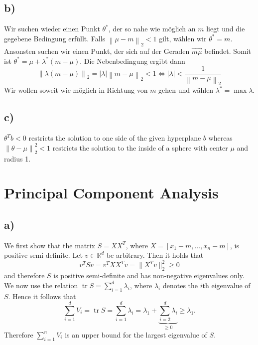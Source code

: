 \documentclass[paper=a4,fontsize=10pt,DIV11,BCOR10mm]{scrartcl}
\newcommand{\abs}[1]{\left\lvert#1\right\rvert}
\newcommand{\norm}[1]{\left\lVert#1\right\rVert}
\DeclareMathOperator{\tr}{tr}
\begin{document}
\subsection*{b)}

Wir suchen wieder einen Punkt $\theta^*$, der so nahe wie möglich an $m$ liegt und die gegebene Bedingung erfüllt. Falls $\norm{\mu - m}_2 < 1$ gilt, wählen wir $\theta^* = m$. Ansonsten suchen wir einen Punkt, der sich auf der Geraden $\overrightarrow{m \mu}$ befindet. Somit ist $\theta^* = \mu + \lambda^* (m - \mu)$. Die Nebenbedingung ergibt dann
\[ \norm{\lambda (m - \mu)}_2 = \abs{\lambda} \norm{m - \mu}_2 < 1 \Leftrightarrow \abs{\lambda} < \frac{1}{\norm{m - \mu}_2} \]
Wir wollen soweit wie möglich in Richtung von $m$ gehen und wählen $\lambda^* = \max \lambda$.



\subsection*{c)}

$\theta^T b < 0$ restricts the solution to one side of the given hyperplane $b$ whereas $\norm{\theta - \mu}_2^2 < 1$ restricts the solution to the inside of a sphere with center $\mu$ and radius 1.





\section{Principal Component Analysis}

\subsection*{a)}

We first show that the matrix $S=XX^T$, where $X=[x_1-m,\dots, x_n-m]$,  is positive semi-definite. Let $v \in \mathbb{R}^d$ be arbitrary. Then it holds that
\begin{equation*}
v^TSv=v^TXX^Tv=\lVert X^Tv\rVert_2^2 \geq 0
\end{equation*}
and therefore $S$ is positive semi-definite and has non-negative eigenvalues only.
We now use the relation $\tr S=\sum_{i=1}^d \lambda_i$, where $\lambda_i$ denotes the $i$th eigenvalue of $S$.
Hence it follows that
\begin{equation}\label{glg1}
\sum_{i=1}^d V_i=\tr S=\sum_{i=1}^d \lambda_i= \lambda_1 + \underbrace{\sum_{i=2}^d \lambda_i}_{\geq 0} \geq \lambda_1\text{.}
\end{equation}
Therefore $\sum_{i=1}^n V_i$ is an upper bound for the largest eigenvalue of $S$.
\end{document}
